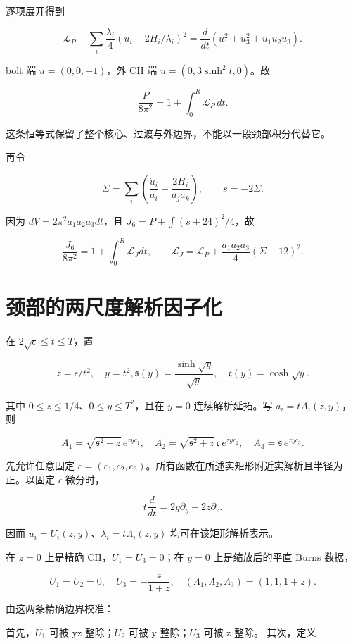 \documentclass[UTF8,11pt,fontset=none]{ctexart}
\theoremstyle{definition}
\theoremstyle{remark}
\begin{document}
逐项展开得到

\[
 \mathscr L_P-\sum_i\frac{\lambda_i}{4}
 (\dot u_i-2H_i/\lambda_i)^2
 =\frac d{dt}(u_1^2+u_3^2+u_1u_2u_3).
\]

bolt 端 \(u=(0,0,-1)\)，外 CH 端 \(u=(0,3\sinh ^2t,0)\)。故

\[
\boxed{\frac{P}{8\pi^2}=1+\int_0^R\mathscr L_P\,dt.}
\tag{5.2.2}
\]

这条恒等式保留了整个核心、过渡与外边界，不能以一段颈部积分代替它。

再令

\[
 \Sigma=\sum_i\left(\frac{\dot u_i}{a_i}
 +\frac{2H_i}{a_ja_k}\right),\qquad s=-2\Sigma.
\]

因为 \(dV=2\pi ^2a_1a_2a_3dt\)，且 \(J_6=P+\int (s+24)^2/4\)，故

\[
 \frac{J_6}{8\pi^2}
 =1+\int_0^R\mathscr L_Jdt,\qquad
 \mathscr L_J=\mathscr L_P+
 \frac{a_1a_2a_3}{4}(\Sigma-12)^2.
\tag{5.2.3}
\]

\section{颈部的两尺度解析因子化}\label{v5-ux9888ux90e8ux7684ux4e24ux5c3aux5ea6ux89e3ux6790ux56e0ux5b50ux5316}

在 \(2\sqrt{\epsilon }\le t\le T\)，置

\[
 z=\epsilon/t^2,\quad y=t^2,
 \mathfrak s(y)=\frac{\sinh\sqrt y}{\sqrt y},\quad
 \mathfrak c(y)=\cosh\sqrt y.
\]

其中 \(0\le z\le 1/4\)、\(0\le y\le T^2\)，且在 \(y=0\) 连续解析延拓。写 \(a_i=t A_i(z,y)\)，则

\[
 A_1=\sqrt{\mathfrak s^2+z}\,e^{zyc_1},\quad
 A_2=\sqrt{\mathfrak s^2+z}\,\mathfrak c\,e^{zyc_2},\quad
 A_3=\mathfrak s\,e^{zyc_3}.
\]

先允许任意固定 \(c=(c_1,c_2,c_3)\)。所有函数在所述实矩形附近实解析且半径为正。以固定 \(\epsilon\) 微分时，

\[
 t\frac d{dt}=2y\partial_y-2z\partial_z.
\]

因而 \(u_i=U_i(z,y)\)、\(\lambda _i=t\Lambda _i(z,y)\) 均可在该矩形解析表示。

在 \(z=0\) 上是精确 CH，\(U_1=U_3=0\)；在 \(y=0\) 上是缩放后的平直 Burns 数据，

\[
 U_1=U_2=0,\quad U_3=-\frac z{1+z},\quad
 (\Lambda_1,\Lambda_2,\Lambda_3)=(1,1,1+z).
\]

由这两条精确边界校准：

首先，\(U_1\) 可被 yz 整除；\(U_2\) 可被 y 整除；\(U_3\) 可被 z 整除。 其次，定义
\end{document}
